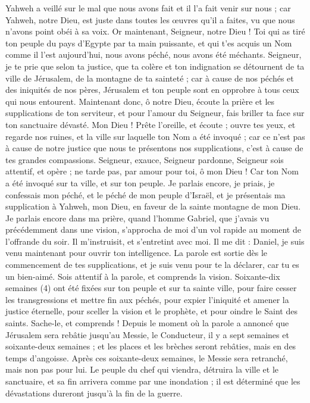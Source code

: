 \begin{multicols}{2}
Yahweh a veillé sur le mal que nous avons fait et il l'a fait venir sur nous ; car Yahweh, notre Dieu, est juste dans toutes les œuvres qu'il a faites, vu que nous n'avons point obéi à sa voix.
Or maintenant, Seigneur, notre Dieu ! Toi qui as tiré ton peuple du pays d'Egypte par ta main puissante, et qui t'es acquis un Nom comme il l’est aujourd'hui, nous avons péché, nous avons été méchants.
Seigneur, je te prie que selon ta justice, que ta colère et ton indignation se détournent de ta ville de Jérusalem, de la montagne de ta sainteté ; car à cause de nos péchés et des iniquités de nos pères, Jérusalem et ton peuple sont en opprobre à tous ceux qui nous entourent.
Maintenant donc, ô notre Dieu, écoute la prière et les supplications de ton serviteur, et pour l'amour du Seigneur, fais briller ta face sur ton sanctuaire dévasté.
Mon Dieu ! Prête l'oreille, et écoute ; ouvre tes yeux, et regarde nos ruines, et la ville sur laquelle ton Nom a été invoqué ; car ce n’est pas à cause de notre justice que nous te présentons nos supplications, c’est à cause de tes grandes compassions.
Seigneur, exauce, Seigneur pardonne, Seigneur sois attentif, et opère ; ne tarde pas, par amour pour toi,  ô mon Dieu ! Car ton Nom a été invoqué sur ta ville, et sur ton peuple.
Je parlais encore, je priais, je confessais mon péché, et le péché de mon peuple d'Israël, et je présentais ma supplication à Yahweh, mon Dieu, en faveur de la sainte montagne de mon Dieu.
Je parlais encore dans ma prière, quand l’homme Gabriel, que j'avais vu précédemment dans une vision, s’approcha de moi d’un vol rapide au moment de l’offrande du soir.
Il m'instruisit, et s’entretint avec moi.  Il me dit : Daniel, je suis venu maintenant pour ouvrir ton intelligence.
La parole est sortie dès le commencement de tes supplications, et je suis venu pour te la déclarer, car tu es un bien-aimé. Sois attentif à la parole, et comprends la vision.
Soixante-dix semaines (4) ont été fixées sur ton peuple et sur ta sainte ville, pour faire cesser les transgressions et mettre fin aux péchés, pour expier l'iniquité et amener la justice éternelle, pour sceller la vision et le prophète, et pour oindre le Saint des saints.
Sache-le, et comprends ! Depuis le moment où la parole a annoncé que Jérusalem sera rebâtie jusqu'au Messie, le Conducteur, il y a sept semaines et soixante-deux semaines ; et les places et les brèches seront rebâties, mais en des temps d'angoisse.
Après ces soixante-deux semaines, le Messie sera retranché, mais non pas pour lui. Le peuple du chef qui viendra, détruira la ville et le sanctuaire, et sa fin arrivera comme par une inondation ; il est déterminé que les dévastations dureront jusqu'à la fin de la guerre.

\end{multicols}
